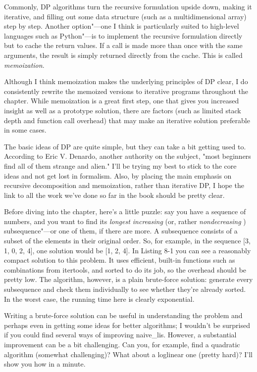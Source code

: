 Commonly, DP algorithms turn the recursive formulation upside down, making it iterative, and filling out some data structure (such as a multidimensional array) step by step. Another option"---one I think is particularly suited to high-level languages such as Python"---is to implement the recursive formulation directly but to cache the return values. If a call is made more than once with the same arguments, the result is simply returned directly from the cache. This is called \textit{memoization}.

\begin{note}
Although I think memoization makes the underlying principles of DP clear, I do consistently rewrite the memoized versions to iterative programs throughout the chapter. While memoization is a great first step, one that gives you increased insight as well as a prototype solution, there are factors (such as limited stack depth and function call overhead) that may make an iterative solution preferable in some cases.
\end{note}

The basic ideas of DP are quite simple, but they can take a bit getting used to. According to Eric V. Denardo, another authority on the subject, "most beginners find all of them strange and alien." I'll be trying my best to stick to the core ideas and not get lost in formalism. Also, by placing the main emphasis on recursive decomposition and memoization, rather than iterative DP, I hope the link to all the work we've done so far in the book should be pretty clear.

Before diving into the chapter, here's a little puzzle: say you have a sequence of numbers, and you want to find its \textit{longest increasing} (or, rather \textit{nondecreasing} ) subsequence"---or one of them, if there are more. A subsequence consists of a subset of the elements in their original order. So, for example, in the sequence [3, 1, 0, 2, 4], one solution would be [1, 2, 4]. In Listing 8-1 you can see a reasonably compact solution to this problem. It uses efficient, built-in functions such as combinations from itertools, and sorted to do its job, so the overhead should be pretty low. The algorithm, however, is a plain brute-force solution: generate every subsequence and check them individually to see whether they're already sorted. In the worst case, the running time here is clearly exponential.

Writing a brute-force solution can be useful in understanding the problem and perhaps even in getting some ideas for better algorithms; I wouldn't be surprised if you could find several ways of improving naive\_lis. However, a substantial improvement can be a bit challenging. Can you, for example, find a quadratic algorithm (somewhat challenging)? What about a loglinear one (pretty hard)? I'll show you how in a minute.

